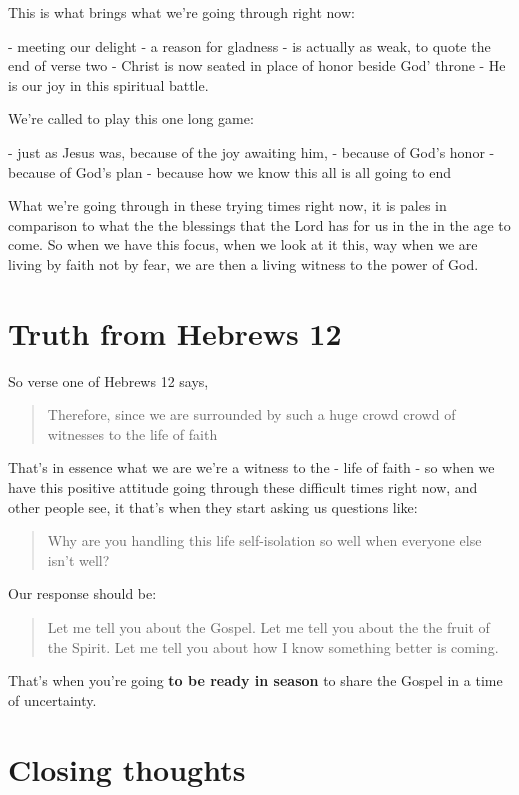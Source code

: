 \documentclass[11pt]{article} %
\begin{document}
This is what brings what we're going through right now:

- meeting our delight
- a reason for gladness
- is actually as weak, to quote the end of verse two
- Christ is now seated in place of honor beside God' throne
- He is our joy in this spiritual battle.

We're called to play this one long game:

- just as Jesus was, because of the joy awaiting him,
- because of God's honor
- because of God's plan
- because how we know this all is all going to end

What we're going through in these trying times right now, it is pales in comparison to what the the
blessings that the Lord has for us in the in the age to come. So when we have this focus, when we
look at it this, way when we are living by faith not by fear, we are then a living witness to the power of God.

\section{Truth from Hebrews 12}

So verse one of Hebrews 12 says,

\begin{quote}
Therefore, since we are surrounded by such a huge crowd crowd of witnesses to the life of faith
\end{quote}

That's in essence what we are we're a witness to the - life of faith - so when we have this positive
attitude going through these difficult times right now, and other people see, it that's when they
start asking us questions like:

\begin{quote}
Why are you handling this life self-isolation so well when everyone else isn't well?
\end{quote}

Our response should be:

\begin{quote}
Let me tell you about the Gospel. Let me tell you about the the fruit of the Spirit. Let me tell you
about how I know something better is coming.
\end{quote}

That's when you're going \textbf{to be ready in season} to share the Gospel in a time of uncertainty.

\section{Closing thoughts}
\end{document}
